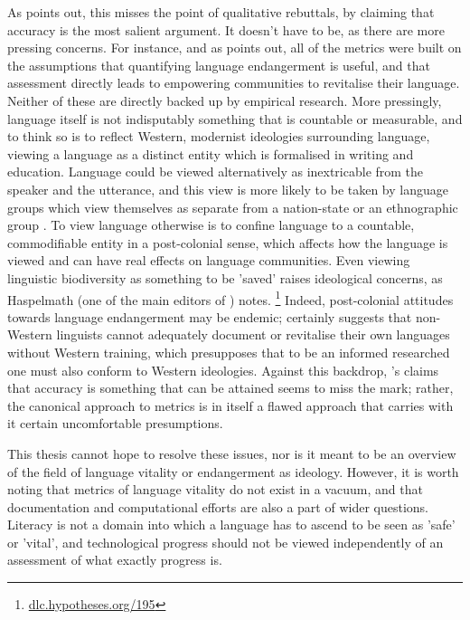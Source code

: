 As \citet{grenoble2016response} points out, this misses the point of qualitative rebuttals, by claiming that accuracy is the most salient argument. It doesn't have to be, as there are more pressing concerns. For instance, and as \citet{grenoble2016response} points out, all of the metrics were built on the assumptions that quantifying language endangerment is useful, and that assessment directly leads to empowering communities to revitalise their language. Neither of these are directly backed up by empirical research. More pressingly, language itself is not indisputably something that is countable or measurable, and to think so is to reflect Western, modernist ideologies surrounding language, viewing a language as a distinct entity which is formalised in writing and education. Language could be viewed alternatively as inextricable from the speaker and the utterance, and this view is more likely to be taken by language groups which view themselves as separate from a nation-state or an ethnographic group \citep{bodo2017language}. To view language otherwise is to confine language to a countable, commodifiable entity in a post-colonial sense, which affects how the language is viewed and can have real effects on language communities. Even viewing linguistic biodiversity as something to be 'saved' raises ideological  concerns, as Haspelmath (one of the main editors of \citet{wals}) notes. \footnote{\href{dlc.hypotheses.org/195}{dlc.hypotheses.org/195}} Indeed, post-colonial attitudes towards language endangerment may be endemic; \citet{newman1998we} certainly suggests that non-Western linguists cannot adequately document or revitalise their own languages without Western training, which presupposes that to be an informed researched one must also conform to Western ideologies. Against this backdrop, \citet{lee2016assessing}'s claims that accuracy is something that can be attained seems to miss the mark; rather, the canonical approach to metrics is in itself a flawed approach that carries with it certain uncomfortable presumptions.

This thesis cannot hope to resolve these issues, nor is it meant to be an overview of the field of language vitality or endangerment as ideology. However, it is worth noting that metrics of language vitality do not exist in a vacuum, and that documentation and computational efforts are also a part of wider questions. Literacy is not a domain into which a language has to ascend to be seen as 'safe' or 'vital', and technological progress should not be viewed independently of an assessment of what exactly progress is.

